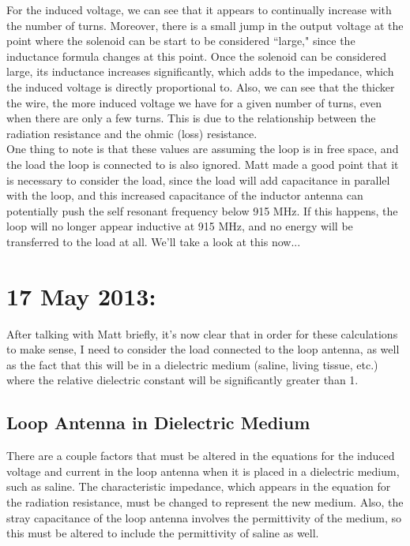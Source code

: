 \documentclass[12pt,onecolumn,titlepage]{article}
\begin{document}
For the induced voltage, we can see that it appears to continually increase with the number of turns. Moreover, there is a small jump in the output voltage at the point where the solenoid can be start to be considered ``large," since the inductance formula changes at this point. Once the solenoid can be considered large, its inductance increases significantly, which adds to the impedance, which the induced voltage is directly proportional to. Also, we can see that the thicker the wire, the more induced voltage we have for a given number of turns, even when there are only a few turns. This is due to the relationship between the radiation resistance and the ohmic (loss) resistance. \\

One thing to note is that these values are assuming the loop is in free space, and the load the loop is connected to is also ignored. Matt made a good point that it is necessary to consider the load, since the load will add capacitance in parallel with the loop, and this increased capacitance of the inductor antenna can potentially push the self resonant frequency below 915 MHz. If this happens, the loop will no longer appear inductive at 915 MHz, and no energy will be transferred to the load at all. We'll take a look at this now...





\clearpage
\section{17 May 2013:}

\indent \indent After talking with Matt briefly, it's now clear that in order for these calculations to make sense, I need to consider the load connected to the loop antenna, as well as the fact that this will be in a dielectric medium (saline, living tissue, etc.) where the relative dielectric constant will be significantly greater than 1.

\subsection{Loop Antenna in Dielectric Medium}
\indent \indent There are a couple factors that must be altered in the equations for the induced voltage and current in the loop antenna when it is placed in a dielectric medium, such as saline. The characteristic impedance, which appears in the equation for the radiation resistance, must be changed to represent the new medium. Also, the stray capacitance of the loop antenna involves the permittivity of the medium, so this must be altered to include the permittivity of saline as well.  
\end{document}
